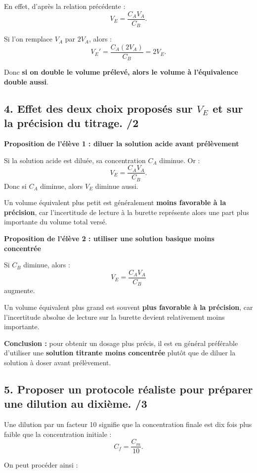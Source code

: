 \documentclass[11pt,a4paper]{article}
\begin{document}
En effet, d'après la relation précédente :
\[
V_E = \frac{C_A V_A}{C_B}.
\]

Si l'on remplace \(V_A\) par \(2V_A\), alors :
\[
V_E' = \frac{C_A(2V_A)}{C_B} = 2V_E.
\]

Donc \textbf{si on double le volume prélevé, alors le volume à l'équivalence double aussi}.

\subsection*{4. Effet des deux choix proposés sur \(V_E\) et sur la précision du titrage. \hfill /2}

\textbf{Proposition de l'élève 1 : diluer la solution acide avant prélèvement}

Si la solution acide est diluée, sa concentration \(C_A\) diminue. Or :
\[
V_E = \frac{C_A V_A}{C_B}.
\]
Donc si \(C_A\) diminue, alors \(V_E\) diminue aussi.

Un volume équivalent plus petit est généralement \textbf{moins favorable à la précision}, car l'incertitude de lecture à la burette représente alors une part plus importante du volume total versé.

\medskip

\textbf{Proposition de l'élève 2 : utiliser une solution basique moins concentrée}

Si \(C_B\) diminue, alors :
\[
V_E = \frac{C_A V_A}{C_B}
\]
augmente.

Un volume équivalent plus grand est souvent \textbf{plus favorable à la précision}, car l'incertitude absolue de lecture sur la burette devient relativement moins importante.

\medskip

\textbf{Conclusion :} pour obtenir un dosage plus précis, il est en général préférable d'utiliser une \textbf{solution titrante moins concentrée} plutôt que de diluer la solution à doser avant prélèvement.

\subsection*{5. Proposer un protocole réaliste pour préparer une dilution au dixième. \hfill /3}

Une dilution par un facteur 10 signifie que la concentration finale est dix fois plus faible que la concentration initiale :
\[
C_f = \frac{C_m}{10}.
\]

On peut procéder ainsi :
\end{document}
